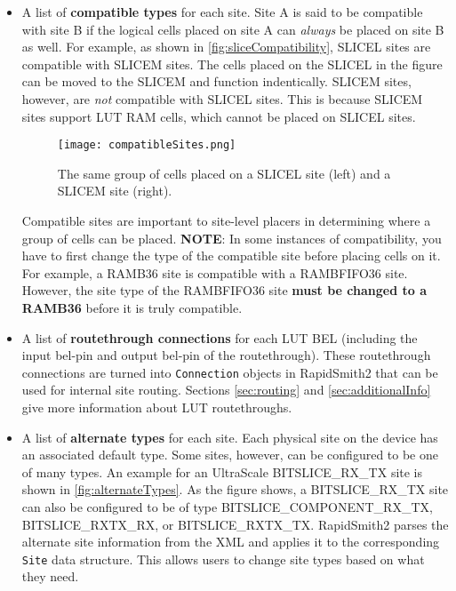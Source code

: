 \begin{itemize}
  \item A list of \textbf{compatible types} for each site. Site A is said to be
  compatible with site B if the logical cells placed on site A can
  \textit{always} be placed on site B as well. For example, as shown in
  \autoref{fig:sliceCompatibility}, SLICEL sites are compatible with SLICEM
  sites. The cells placed on the SLICEL in the figure can be moved to the
  SLICEM and function indentically. SLICEM sites, however, are \textit{not}
  compatible with SLICEL sites. This is because SLICEM sites support LUT RAM
  cells, which cannot be placed on SLICEL sites.
  
  \begin{figure}[H]
    \centering
    \texttt{[image: compatibleSites.png]}
    \caption{The same group of cells placed on a SLICEL site (left) and a SLICEM
    site (right).}
    \label{fig:sliceCompatibility}
  \end{figure}
  
  \noindent Compatible sites are important
  to site-level placers in determining where a group of cells can be placed.
  \textbf{NOTE}: In some instances of compatibility, you have to first change
  the type of the compatible site before placing cells on it. For example, a
  RAMB36 site is compatible with a RAMBFIFO36 site. However, the site type of
  the RAMBFIFO36 site \textbf{must be changed to a RAMB36} before it is
  truly compatible.
  
  \item A list of \textbf{routethrough connections} for each LUT BEL (including
  the input bel-pin and output bel-pin of the routethrough). These routethrough
  connections are turned into \texttt{Connection} objects in RapidSmith2 that
  can be used for internal site routing. Sections \ref{sec:routing} and
  \ref{sec:additionalInfo} give more information about LUT routethroughs.
  
  \item A list of \textbf{alternate types} for each site. Each physical site on
  the device has an associated default type. Some sites, however, can be
  configured to be one of many types. An example for an UltraScale
  BITSLICE\_RX\_TX site is shown in \autoref{fig:alternateTypes}. As the figure
  shows, a BITSLICE\_RX\_TX site can also be configured to be of type
  BITSLICE\_COMPONENT\_RX\_TX, BITSLICE\_RXTX\_RX, or BITSLICE\_RXTX\_TX.
  RapidSmith2 parses the alternate site information from the XML and applies it
  to the corresponding \texttt{Site} data structure. This allows users to change
  site types based on what they need.
  

\end{itemize}
